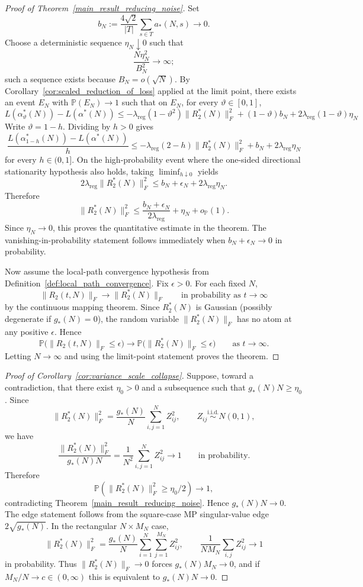 \documentclass[11pt]{article}
\theoremstyle{plain}
\theoremstyle{definition}
\theoremstyle{remark}
\newcommand{\PP}{\mathbb{P}}
\newcommand{\1}{\mathbf{1}}
\begin{document}
\begin{proof}[Proof of Theorem~\ref{main_result_reducing_noise}]
Set
\[
b_N:=\frac{4\sqrt{2}}{|T|}\sum_{s\in T}a_*(N,s)\to 0.
\]
Choose a deterministic sequence \(\eta_N\downarrow0\) such that
\[
\frac{N\eta_N^2}{B_N^2}\to\infty;
\]
such a sequence exists because \(B_N=o(\sqrt N)\). By Corollary~\ref{cor:scaled_reduction_of_loss} applied at the limit point, there exists an event \(E_N\) with \(\PP(E_N)\to1\) such that on \(E_N\), for every \(\vartheta\in[0,1]\),
\[
L(\alpha_\vartheta^*(N))-L(\alpha^*(N))
\le
-\lambda_{\mathrm{reg}}(1-\vartheta^2)\|R_2^*(N)\|_F^2
+(1-\vartheta)b_N
+2\lambda_{\mathrm{reg}}(1-\vartheta)\eta_N
\]
Write \(\vartheta=1-h\). Dividing by \(h>0\) gives
\[
\frac{L(\alpha_{1-h}^*(N))-L(\alpha^*(N))}{h}
\le
-\lambda_{\mathrm{reg}}(2-h)\|R_2^*(N)\|_F^2
+b_N
+2\lambda_{\mathrm{reg}}\eta_N
\]
for every \(h\in(0,1]\). On the high-probability event where the one-sided directional stationarity hypothesis also holds, taking \(\liminf_{h\downarrow0}\) yields
\[
2\lambda_{\mathrm{reg}}\|R_2^*(N)\|_F^2
\le
b_N+\epsilon_N+2\lambda_{\mathrm{reg}}\eta_N.
\]
Therefore
\[
\|R_2^*(N)\|_F^2
\le
\frac{b_N+\epsilon_N}{2\lambda_{\mathrm{reg}}}+\eta_N
+o_{\PP}(1).
\]
Since \(\eta_N\to0\), this proves the quantitative estimate in the theorem. The vanishing-in-probability statement follows immediately when \(b_N+\epsilon_N\to0\) in probability.

Now assume the local-path convergence hypothesis from Definition~\ref{def:local_path_convergence}. Fix \(\epsilon>0\). For each fixed \(N\),
\[
\|R_2(t,N)\|_F\to \|R_2^*(N)\|_F
\qquad\text{in probability as }t\to\infty
\]
by the continuous mapping theorem. Since \(R_2^*(N)\) is Gaussian (possibly degenerate if \(g_*(N)=0\)), the random variable \(\|R_2^*(N)\|_F\) has no atom at any positive \(\epsilon\). Hence
\[
\PP\big(\|R_2(t,N)\|_F\le \epsilon\big)\to \PP\big(\|R_2^*(N)\|_F\le \epsilon\big)
\qquad\text{as }t\to\infty.
\]
Letting \(N\to\infty\) and using the limit-point statement proves the theorem.
\end{proof}

\begin{proof}[Proof of Corollary~\ref{cor:variance_scale_collapse}]
Suppose, toward a contradiction, that there exist \(\eta_0>0\) and a subsequence such that \(g_*(N)N\ge \eta_0\). Since
\[
\|R_2^*(N)\|_F^2
=
\frac{g_*(N)}{N}\sum_{i,j=1}^{N} Z_{ij}^2,
\qquad
Z_{ij}\overset{\mathrm{i.i.d.}}{\sim}N(0,1),
\]
we have
\[
\frac{\|R_2^*(N)\|_F^2}{g_*(N)N}
=
\frac{1}{N^2}\sum_{i,j=1}^{N}Z_{ij}^2
\to 1
\qquad\text{in probability}.
\]
Therefore
\[
\PP\!\left(\|R_2^*(N)\|_F^2\ge \eta_0/2\right)\to 1,
\]
contradicting Theorem~\ref{main_result_reducing_noise}. Hence \(g_*(N)N\to0\). The edge statement follows from the square-case MP singular-value edge \(2\sqrt{g_*(N)}\).
In the rectangular \(N\times M_N\) case,
\[
\|R_2^*(N)\|_F^2
=
\frac{g_*(N)}{N}\sum_{i=1}^{N}\sum_{j=1}^{M_N}Z_{ij}^2,
\qquad
\frac{1}{NM_N}\sum_{i,j}Z_{ij}^2\to1
\]
in probability. Thus \(\|R_2^*(N)\|_F\to0\) forces \(g_*(N)M_N\to0\), and if \(M_N/N\to c\in(0,\infty)\) this is equivalent to \(g_*(N)N\to0\).
\end{proof}
\end{document}
